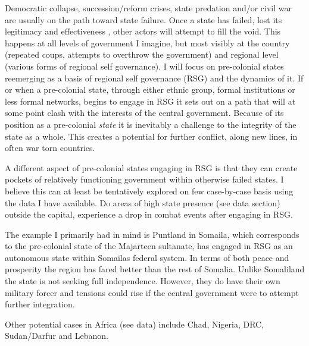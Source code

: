 \documentclass[12pt]{article}
\begin{document}
Democratic collapse, succession/reform crises, state predation and/or civil war
are usually on the path toward state failure\citep{Goldstone_2008}. Once a state
has failed, lost its legitimacy and effectiveness \citep{Goldstone_2008}, other
actors will attempt to fill the void. This happens at all levels of government I
imagine, but most visibly at the country (repeated coups, attempts to overthrow
the government) and regional level (various forms of regional self governance).
I will focus on pre-colonial states reemerging as a basis of regional self
governance  (RSG) and the dynamics of it. If or when a pre-colonial state,
through either ethnic group, formal institutions or less formal networks, begins
to engage in RSG it sets out on a path that will at some point clash with the
interests of the central government. Because of its position as a pre-colonial
\textit{state} it is inevitably a challenge to the integrity of the state as a
whole. This creates a potential for further conflict, along new lines, in often
war torn countries. 

A different aspect of pre-colonial states engaging in RSG is that they can
create pockets of relatively functioning government within otherwise failed
states. I believe this can at least be tentatively explored on few case-by-case
basis using the data I have available. Do areas of high state presence (see data
section) outside the capital, experience a drop in combat events after engaging
in RSG. 

The example I primarily had in mind is  Puntland in Somaila, which corresponds
to the pre-colonial state of the Majarteen sultanate, has engaged in RSG as an
autonomous state within Somailas federal system. In terms of both peace and
prosperity the region has fared better than the rest of Somalia. Unlike
Somaliland the state is not seeking full independence. However, they do have
their own military forcer and tensions could rise if the central government were
to attempt further integration.

Other potential cases in Africa (see data) include Chad, Nigeria, DRC,
Sudan/Darfur and Lebanon.
\end{document}
